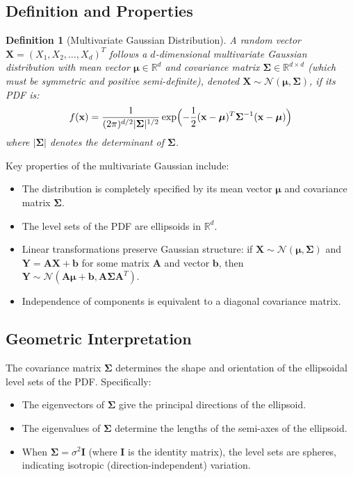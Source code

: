 \documentclass{article}
\newtheorem{definition}{Definition}
\begin{document}
\subsection{Definition and Properties}

\begin{definition}[Multivariate Gaussian Distribution]
A random vector $\mathbf{X} = (X_1, X_2, \ldots, X_d)^T$ follows a $d$-dimensional multivariate Gaussian distribution with mean vector $\boldsymbol{\mu} \in \mathbb{R}^d$ and covariance matrix $\boldsymbol{\Sigma} \in \mathbb{R}^{d \times d}$ (which must be symmetric and positive semi-definite), denoted $\mathbf{X} \sim \mathcal{N}(\boldsymbol{\mu}, \boldsymbol{\Sigma})$, if its PDF is:
\[
f(\mathbf{x}) = \frac{1}{(2\pi)^{d/2}|\boldsymbol{\Sigma}|^{1/2}} \exp\Bigl(-\frac{1}{2}(\mathbf{x}-\boldsymbol{\mu})^T \boldsymbol{\Sigma}^{-1} (\mathbf{x}-\boldsymbol{\mu})\Bigr)
\]
where $|\boldsymbol{\Sigma}|$ denotes the determinant of $\boldsymbol{\Sigma}$.
\end{definition}

Key properties of the multivariate Gaussian include:

\begin{itemize}
\item The distribution is completely specified by its mean vector $\boldsymbol{\mu}$ and covariance matrix $\boldsymbol{\Sigma}$.
\item The level sets of the PDF are ellipsoids in $\mathbb{R}^d$.
\item Linear transformations preserve Gaussian structure: if $\mathbf{X} \sim \mathcal{N}(\boldsymbol{\mu}, \boldsymbol{\Sigma})$ and $\mathbf{Y} = \mathbf{A}\mathbf{X} + \mathbf{b}$ for some matrix $\mathbf{A}$ and vector $\mathbf{b}$, then $\mathbf{Y} \sim \mathcal{N}(\mathbf{A}\boldsymbol{\mu} + \mathbf{b}, \mathbf{A}\boldsymbol{\Sigma}\mathbf{A}^T)$.
\item Independence of components is equivalent to a diagonal covariance matrix.
\end{itemize}

\subsection{Geometric Interpretation}

The covariance matrix $\boldsymbol{\Sigma}$ determines the shape and orientation of the ellipsoidal level sets of the PDF. Specifically:
\begin{itemize}
\item The eigenvectors of $\boldsymbol{\Sigma}$ give the principal directions of the ellipsoid.
\item The eigenvalues of $\boldsymbol{\Sigma}$ determine the lengths of the semi-axes of the ellipsoid.
\item When $\boldsymbol{\Sigma} = \sigma^2 \mathbf{I}$ (where $\mathbf{I}$ is the identity matrix), the level sets are spheres, indicating isotropic (direction-independent) variation.
\end{itemize}
\end{document}
